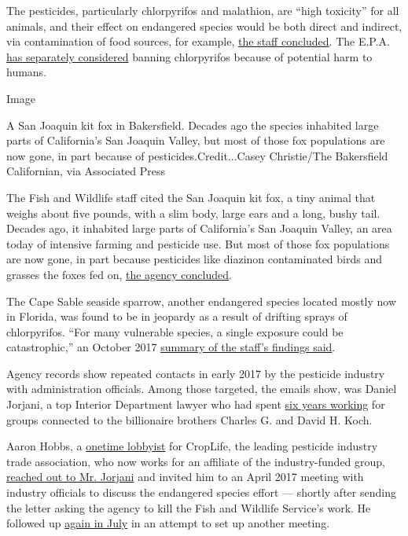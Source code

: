 The pesticides, particularly chlorpyrifos and malathion, are ``high
toxicity'' for all animals, and their effect on endangered species would
be both direct and indirect, via contamination of food sources, for
example,
\href{https://www.documentcloud.org/documents/5778894-Trump-Era-Shift-Evaluating-Pesticide-Threats-to.html\#document/p88/a488287}{the
staff concluded}. The E.P.A.
\href{https://www.nytimes.com/2017/03/29/us/politics/epa-insecticide-chlorpyrifos.html}{has
separately considered} banning chlorpyrifos because of potential harm to
humans.

Image

A San Joaquin kit fox in Bakersfield. Decades ago the species inhabited
large parts of California's San Joaquin Valley, but most of those fox
populations are now gone, in part because of pesticides.Credit...Casey
Christie/The Bakersfield Californian, via Associated Press

The Fish and Wildlife staff cited the San Joaquin kit fox, a tiny animal
that weighs about five pounds, with a slim body, large ears and a long,
bushy tail. Decades ago, it inhabited large parts of California's San
Joaquin Valley, an area today of intensive farming and pesticide use.
But most of those fox populations are now gone, in part because
pesticides like diazinon contaminated birds and grasses the foxes fed
on,
\href{https://www.documentcloud.org/documents/5778894-Trump-Era-Shift-Evaluating-Pesticide-Threats-to.html\#document/p101/a488289}{the
agency concluded}.

The Cape Sable seaside sparrow, another endangered species located
mostly now in Florida, was found to be in jeopardy as a result of
drifting sprays of chlorpyrifos. ``For many vulnerable species, a single
exposure could be catastrophic,'' an October 2017
\href{https://www.documentcloud.org/documents/5778894-Trump-Era-Shift-Evaluating-Pesticide-Threats-to.html\#document/p100/a488288}{summary
of the staff's findings said}.

Agency records show repeated contacts in early 2017 by the pesticide
industry with administration officials. Among those targeted, the emails
show, was Daniel Jorjani, a top Interior Department lawyer who had spent
\href{https://www.documentcloud.org/documents/4873360-Daniel-Jorjani-Resume.html}{six
years working} for groups connected to the billionaire brothers Charles
G. and David H. Koch.

Aaron Hobbs, a
\href{http://disclosures.house.gov/ld/pdfform.aspx?id=300343238}{onetime
lobbyist} for CropLife, the leading pesticide industry trade
association, who now works for an affiliate of the industry-funded
group,
\href{https://www.documentcloud.org/documents/5778894-Trump-Era-Shift-Evaluating-Pesticide-Threats-to.html\#document/p28/a488253}{reached
out to Mr. Jorjani} and invited him to an April 2017 meeting with
industry officials to discuss the endangered species effort --- shortly
after sending the letter asking the agency to kill the Fish and Wildlife
Service's work. He followed up
\href{https://www.documentcloud.org/documents/5778894-Trump-Era-Shift-Evaluating-Pesticide-Threats-to.html\#document/p37/a488258}{again
in July} in an attempt to set up another meeting.

